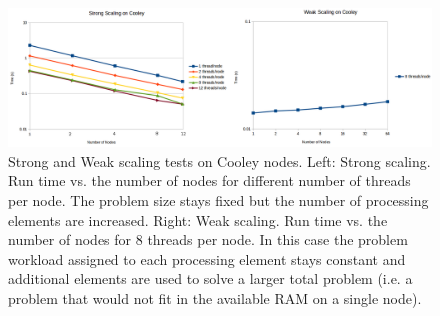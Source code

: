 \documentclass[10pt,letterpaper]{article}
\begin{document}
\begin{figure}[h!]
    \centering
    \includegraphics[width=1.0\textwidth]{Strong_Weak.png}
    \caption{Strong and Weak scaling tests on Cooley nodes. Left: Strong scaling. Run time vs. the number of nodes for different number of threads per node.
	    The problem size stays fixed but the number of processing elements are increased.
    Right: Weak scaling. Run time vs. the number of nodes for 8 threads per node.
    In this case the problem workload assigned to each processing element stays constant and additional elements are used to solve a larger total problem (i.e. a problem that would not fit in the available RAM on a single node).}
    \label{fig:Strong_Weak}
\end{figure}

\pagebreak







\end{document}
